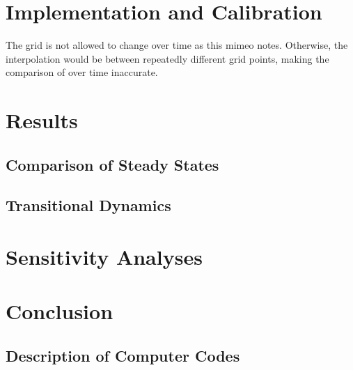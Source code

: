 \documentclass[12pt]{article}
\numberwithin{equation}{section} %
\begin{document}
\section{Implementation and Calibration}
\label{sec:implementation}

The grid is not allowed to change over time as this mimeo notes. Otherwise, the interpolation would be between repeatedly different grid points, making the comparison of over time inaccurate. 

\section{Results}
\label{sec:results}

\subsection{Comparison of Steady States}
\label{sec:results-stst}

\subsection{Transitional Dynamics}
\label{sec:results-transition}

\section{Sensitivity Analyses}
\label{sec:sensitivity}

\section{Conclusion}
\label{sec:conclusion}

\newpage
\thispagestyle{plain}
\printbibliography[heading=bibintoc] %

\newpage
\thispagestyle{plain}
\begin{appendices}
\section{Description of Computer Codes}
\end{appendices}
\end{document}
